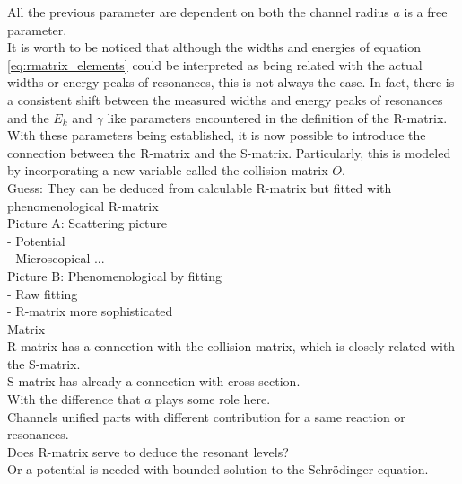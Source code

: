 \documentclass[openany]{book}
\begin{document}
All the previous parameter are dependent on both the channel radius  $a$ is a free parameter.  \\

It is worth to be noticed that although the widths and energies of equation \ref{eq:rmatrix_elements} could be interpreted as being related with the actual widths or energy peaks of resonances, this is not always the case. In fact, there is a consistent shift between the measured widths and energy peaks of resonances and the $E_k$ and $\gamma$ like parameters encountered in the definition of the R-matrix.  \\

With these parameters being established, it is now possible to introduce the connection between the R-matrix and the S-matrix. Particularly, this is modeled by incorporating a new variable called the collision matrix $O$. \\

Guess: They can be deduced from calculable R-matrix
but fitted with phenomenological R-matrix \\

Picture A: Scattering picture \\
	-	Potential \\
	-	Microscopical ... \\
	
Picture B: Phenomenological by fitting \\
	-	 Raw fitting \\
	-	R-matrix more sophisticated  \\

Matrix \\

R-matrix has a connection with the collision matrix, which is closely related with the S-matrix.  \\

S-matrix has already a connection with cross section. \\

With the difference that $a$ plays some role here.  \\

Channels unified parts with different contribution for a same reaction or resonances.  \\

Does R-matrix serve to deduce the resonant levels?  \\

Or a potential is needed with bounded solution to the Schrödinger equation.   \\
\end{document}
